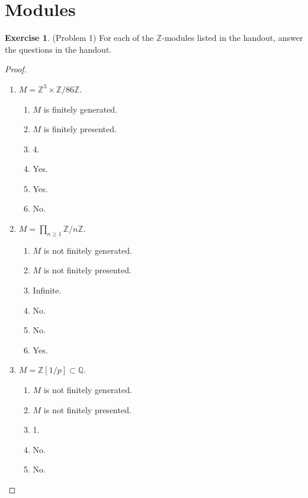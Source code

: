 \documentclass[12pt, psamsfonts]{amsart}
\theoremstyle{definition}
\newtheorem*{exer}{Exercise}
\theoremstyle{remark}
\numberwithin{equation}{section}
\begin{document}
\section{Modules}

\begin{exer}{(Problem 1)}
  For each of the $\mathbb{Z}$-modules listed in the handout, answer the questions in the handout.
\end{exer}

\begin{proof}
$ $
  \begin{enumerate}[label=(\alph*)]
    \item 
      $M = \mathbb{Z}^3 \times \mathbb{Z} / 86\mathbb{Z}$.
      \begin{enumerate}[label=(\roman*)]
        \item 
          $M$ is finitely generated.
        \item
          $M$ is finitely presented.
        \item
          4.
        \item
          Yes.
        \item
          Yes.
        \item
          No.
      \end{enumerate}
    \item 
      $M = \prod_{n \geq 1} \mathbb{Z} / n\mathbb{Z}$.
      \begin{enumerate}[label=(\roman*)]
        \item 
          $M$ is not finitely generated.
        \item
          $M$ is not finitely presented.
        \item
          Infinite.
        \item
          No.
        \item
          No.
        \item
          Yes.
      \end{enumerate}
    \item 
      $M = \mathbb{Z}[1/p] \subset \mathbb{Q}$.
      \begin{enumerate}[label=(\roman*)]
        \item 
          $M$ is not finitely generated.
        \item
          $M$ is not finitely presented.
        \item
          1.
        \item
          No.
        \item
          No.

\end{enumerate}
\end{enumerate}
\end{proof}
\end{document}
